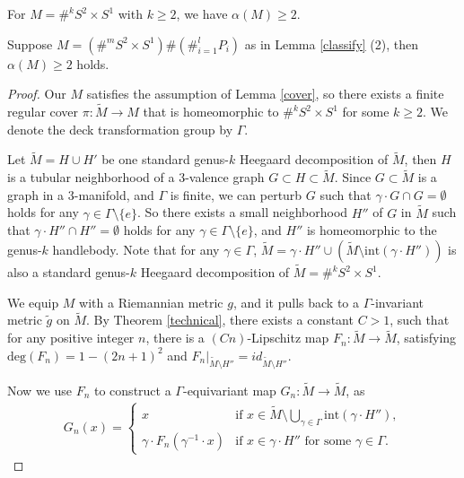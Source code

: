 \documentclass[10pt,a4paper]{amsart}
\begin{document}
\begin{lem}\label{easy}
For $M=\#^k S^2\times S^1$ with $k\geq 2$, we have $\alpha(M)\geq 2$.
\end{lem}

\begin{thm}\label{sphericalsummand}
Suppose $M=(\#^m S^2\times S^1)\#(\#_{i=1}^l P_i)$ as in Lemma \ref{classify} (2), then $\alpha(M)\geq 2$ holds.
\end{thm}

\begin{proof}
Our $M$ satisfies the assumption of Lemma \ref{cover}, so there exists a finite regular cover $\pi:\tilde{M}\to M$ that is homeomorphic to $\#^kS^2\times S^1$ for some $k\geq 2$. We denote the deck transformation group by $\Gamma$. 

Let $\tilde{M}=H\cup H'$ be one standard genus-$k$ Heegaard decomposition of $\tilde{M}$, then $H$ is a tubular neighborhood of a $3$-valence graph $G\subset H \subset \tilde{M}$. Since $G\subset \tilde{M}$ is a graph in a $3$-manifold, and $\Gamma$ is finite, we can perturb $G$ such that $\gamma\cdot G\cap G=\emptyset$ holds for any $\gamma\in \Gamma\setminus \{e\}$.  So there exists a small neighborhood $H''$ of $G$ in $\tilde{M}$ such that $\gamma\cdot H''\cap H''=\emptyset$ holds for any $\gamma\in \Gamma\setminus \{e\}$, and $H''$ is homeomorphic to the genus-$k$ handlebody. Note that for any $\gamma\in \Gamma$, $\tilde{M}=\gamma\cdot H''\cup (\tilde{M}\setminus \text{int}(\gamma \cdot H''))$ is also a standard genus-$k$ Heegaard decomposition of $\tilde{M}=\#^kS^2\times S^1$.



We equip $M$ with a Riemannian metric $g$, and it pulls back to a $\Gamma$-invariant metric $\tilde{g}$ on $\tilde{M}$.
By Theorem \ref{technical}, there exists a constant $C>1$, such that for any positive integer $n$, there is a $(Cn)$-Lipschitz map $F_n:\tilde{M}\to \tilde{M}$, satisfying $\text{deg}(F_n)=1-(2n+1)^2$ and $F_n|_{\tilde{M}\setminus H''}=id_{\tilde{M}\setminus H''}$.

Now we use $F_n$ to construct a $\Gamma$-equivariant map $G_n:\tilde{M}\to \tilde{M}$, as 
\begin{equation*}
\begin{aligned}
G_n(x)=\begin{cases}
x & \text{if\ } x\in \tilde{M}\setminus \bigcup_{\gamma\in \Gamma}\text{int}(\gamma \cdot H''),\\
\gamma \cdot F_n(\gamma^{-1}\cdot x) & \text{if\ } x\in \gamma \cdot H'' \text{\ for\ some\ }\gamma\in \Gamma. 
\end{cases}
\end{aligned}
\end{equation*}




\end{proof}
\end{document}
